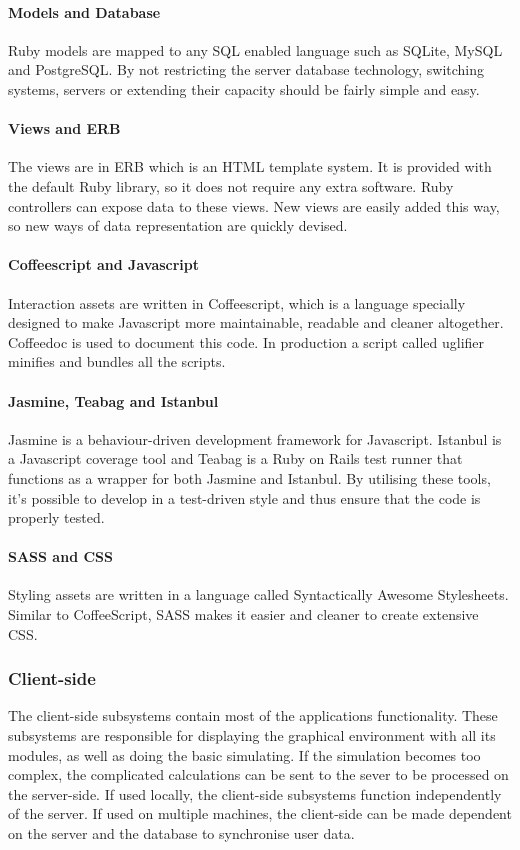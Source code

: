 \documentclass{report}
\begin{document}
				\paragraph{Models and Database}
					Ruby models are mapped to any SQL enabled language such as SQLite, MySQL and PostgreSQL. By not restricting the server database technology, switching systems, servers or extending  their capacity should be fairly simple and easy.
				\paragraph{Views and ERB}
					The views are in ERB which is an HTML template system. It is provided with the default Ruby library, so it does not require any extra software. Ruby controllers can expose data to these views. New views are easily added this way, so new ways of data representation are quickly devised.
				\paragraph{Coffeescript and Javascript}
					Interaction assets are written in Coffeescript, which is a language specially designed to make Javascript more maintainable, readable and cleaner altogether. Coffeedoc is used to document this code. In production a script called uglifier minifies and bundles all the scripts.
				\paragraph{Jasmine, Teabag and Istanbul}
					 Jasmine is a behaviour-driven development framework for Javascript. Istanbul is a Javascript coverage tool and Teabag is a Ruby on Rails test runner that functions as a wrapper for both Jasmine and Istanbul. By utilising these tools, it's possible to develop in a test-driven style and thus ensure that the code is properly tested.
				\paragraph{SASS and CSS}
					Styling assets are written in a language called Syntactically Awesome Stylesheets. Similar to CoffeeScript, SASS makes it easier and cleaner to create extensive CSS. 
			\subsubsection{Client-side}
				The client-side subsystems contain most of the applications functionality. These subsystems are responsible for displaying the graphical environment with all its modules, as well as doing the basic simulating. If the simulation becomes too complex, the complicated calculations can be sent to the sever to be processed on the server-side. If used locally, the client-side subsystems function independently of the server. If used on multiple machines, the client-side can be made dependent on the server and the database to synchronise user data.
\end{document}
